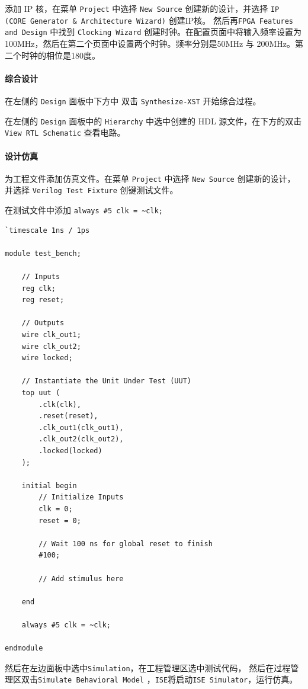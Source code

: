 \documentclass{ctexart}
\begin{document}
        添加 IP 核，在菜单 \verb|Project| 中选择 \verb|New Source| 创建新的设计，并选择 \verb|IP (CORE Generator & Architecture Wizard)| 创建IP核。
        然后再\verb|FPGA Features and Design| 中找到 \verb|Clocking Wizard| 创建时钟。在配置页面中将输入频率设置为100MHz，然后在第二个页面中设置两个时钟。频率分别是50MHz 与 200MHz。第二个时钟的相位是180度。

        \paragraph{综合设计}

        在左侧的 \verb|Design| 面板中下方中 双击 \verb|Synthesize-XST| 开始综合过程。

        在左侧的 \verb|Design| 面板中的 \verb|Hierarchy| 中选中创建的 HDL 源文件，在下方的双击 \verb|View RTL Schematic| 查看电路。

        \paragraph{设计仿真}
        
        为工程文件添加仿真文件。在菜单 \verb|Project| 中选择 \verb|New Source| 创建新的设计，并选择 \verb|Verilog Test Fixture| 创键测试文件。

        在测试文件中添加 \lstinline|always #5 clk = ~clk;|
        \begin{lstlisting}
`timescale 1ns / 1ps

module test_bench;

	// Inputs
	reg clk;
	reg reset;

	// Outputs
	wire clk_out1;
	wire clk_out2;
	wire locked;

	// Instantiate the Unit Under Test (UUT)
	top uut (
		.clk(clk), 
		.reset(reset), 
		.clk_out1(clk_out1), 
		.clk_out2(clk_out2), 
		.locked(locked)
	);

	initial begin
		// Initialize Inputs
		clk = 0;
		reset = 0;

		// Wait 100 ns for global reset to finish
		#100;
 
		// Add stimulus here

	end
	
	always #5 clk = ~clk;
      
endmodule
        \end{lstlisting}

        然后在左边面板中选中\verb|Simulation|，在工程管理区选中测试代码，
        然后在过程管理区双击\verb|Simulate Behavioral Model|
        ，\verb|ISE|将启动\verb|ISE Simulator|，运行仿真。
\end{document}
